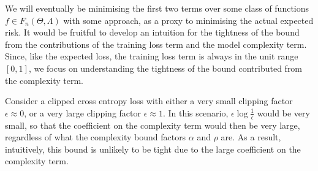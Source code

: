 \documentclass{article}
\begin{document}
		We will eventually be minimising the first two terms over some class of functions $f \in F_{n}(\Theta, \Lambda)$ with some approach, as a proxy to minimising the actual expected risk. It would be fruitful to develop an intuition for the tightness of the bound from the contributions of the training loss term and the model complexity term. Since, like the expected loss, the training loss term is always in the unit range $[0, 1]$, we focus on understanding the tightness of the bound contributed from the complexity term.
		
%		
%		
		
		Consider a clipped cross entropy loss with either a very small clipping factor $\epsilon \approx 0$, or a very large clipping factor $\epsilon \approx 1$. In this scenario, $\epsilon \log{\frac{1}{\epsilon}}$ would be very small, so that the coefficient on the complexity term would then be very large, regardless of what the complexity bound factors $\alpha$ and $\rho$ are. As a result, intuitively, this bound is unlikely to be tight due to the large coefficient on the complexity term.
		
\end{document}
